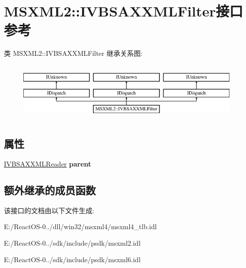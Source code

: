 \hypertarget{interface_m_s_x_m_l2_1_1_i_v_b_s_a_x_x_m_l_filter}{}\section{M\+S\+X\+M\+L2\+:\+:I\+V\+B\+S\+A\+X\+X\+M\+L\+Filter接口 参考}
\label{interface_m_s_x_m_l2_1_1_i_v_b_s_a_x_x_m_l_filter}
类 M\+S\+X\+M\+L2\+:\+:I\+V\+B\+S\+A\+X\+X\+M\+L\+Filter 继承关系图\+:\begin{figure}[H]
\begin{center}
\leavevmode
\includegraphics[height=3.000000cm]{interface_m_s_x_m_l2_1_1_i_v_b_s_a_x_x_m_l_filter}
\end{center}
\end{figure}
\subsection*{属性}
\begin{DoxyCompactItemize}
\item 
\mbox{\label{interface_m_s_x_m_l2_1_1_i_v_b_s_a_x_x_m_l_filter_afbd3a64848a9e69c2d460052a6f7d968}} 
\hyperlink{interface_m_s_x_m_l2_1_1_i_v_b_s_a_x_x_m_l_reader}{I\+V\+B\+S\+A\+X\+X\+M\+L\+Reader} {\bfseries parent}
\end{DoxyCompactItemize}
\subsection*{额外继承的成员函数}


该接口的文档由以下文件生成\+:\begin{DoxyCompactItemize}
\item 
E\+:/\+React\+O\+S-\/0../dll/win32/msxml4/msxml4\+\_\+tlb.\+idl\item 
E\+:/\+React\+O\+S-\/0../sdk/include/psdk/msxml2.\+idl\item 
E\+:/\+React\+O\+S-\/0../sdk/include/psdk/msxml6.\+idl\end{DoxyCompactItemize}
